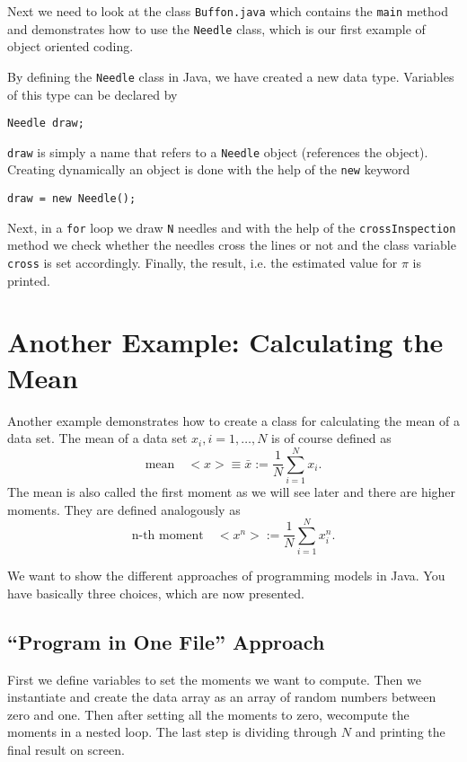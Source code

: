 Next we need to look at the class \verb|Buffon.java| which contains the
\verb|main| method and demonstrates how to use the \verb|Needle| class,
which is our first example of object oriented coding.


By defining the \verb|Needle| class in Java, we have created a new
data type. Variables of this type can be declared by
\begin{verbatim}
Needle draw;
\end{verbatim}
\verb|draw| is simply a name that refers to a \verb|Needle|
object (references the object). 
Creating dynamically an object
is done with the help of the \verb|new| keyword
\begin{verbatim}
draw = new Needle();
\end{verbatim}
Next, in a \verb|for| loop we draw \verb|N|  needles and with the help
of the \verb|crossInspection| method we check whether the needles
cross the lines or not and the class variable \verb|cross| is set
accordingly. Finally, the result, i.e. the estimated value
for $\pi$ is printed.



\section{Another Example: Calculating the Mean}
Another example demonstrates how to create a class for calculating
the mean of a data set. The mean of a data set $x_i, i=1,\ldots,N$ 
is of course defined as
$$ \text{mean}\quad  <x> \equiv \bar{x} := \frac{1}{N}\sum_{i=1}^{N} x_i.$$ 
The mean is also called the first moment as we will see later and
there are higher moments. They are defined analogously
as
$$ \text{n-th moment}\quad <x^n> :=  \frac{1}{N}\sum_{i=1}^{N} x_i^n.$$  
 
We want to show the
different approaches of programming models in Java. 
You have basically three choices, which are now presented.

\subsection{``Program in One File'' Approach}
First we define variables to set the moments we want to compute.
Then we instantiate and create the data array as an array of
random numbers between zero and one. Then after setting all the moments
to zero, wecompute the moments in a nested loop. The last step
is dividing through $N$ and printing the final result on screen.



